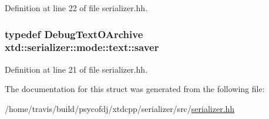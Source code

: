Definition at line 22 of file serializer.\-hh.

\hypertarget{structxtd_1_1serializer_1_1mode_1_1text_a8be416039df8bbed799423bb996811a8}{
\subsubsection[{saver}]{\setlength{\rightskip}{0pt plus 5cm}typedef {\bf Debug\-Text\-O\-Archive} {\bf xtd\-::serializer\-::mode\-::text\-::saver}}}\label{structxtd_1_1serializer_1_1mode_1_1text_a8be416039df8bbed799423bb996811a8}


Definition at line 21 of file serializer.\-hh.



The documentation for this struct was generated from the following file\-:\begin{DoxyCompactItemize}
\item 
/home/travis/build/psycofdj/xtdcpp/serializer/src/\hyperlink{serializer_8hh}{serializer.\-hh}\end{DoxyCompactItemize}
